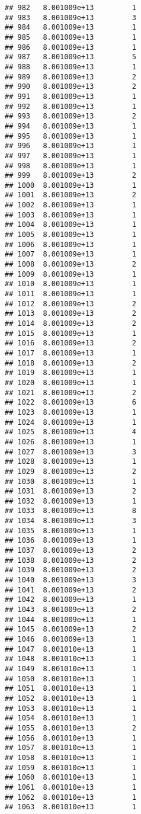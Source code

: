 \documentclass[
]{article}
\begin{document}
\begin{verbatim}
## 982   8.001009e+13         1
## 983   8.001009e+13         3
## 984   8.001009e+13         1
## 985   8.001009e+13         1
## 986   8.001009e+13         1
## 987   8.001009e+13         5
## 988   8.001009e+13         1
## 989   8.001009e+13         2
## 990   8.001009e+13         2
## 991   8.001009e+13         1
## 992   8.001009e+13         1
## 993   8.001009e+13         2
## 994   8.001009e+13         1
## 995   8.001009e+13         1
## 996   8.001009e+13         1
## 997   8.001009e+13         1
## 998   8.001009e+13         1
## 999   8.001009e+13         2
## 1000  8.001009e+13         1
## 1001  8.001009e+13         2
## 1002  8.001009e+13         1
## 1003  8.001009e+13         1
## 1004  8.001009e+13         1
## 1005  8.001009e+13         1
## 1006  8.001009e+13         1
## 1007  8.001009e+13         1
## 1008  8.001009e+13         2
## 1009  8.001009e+13         1
## 1010  8.001009e+13         1
## 1011  8.001009e+13         1
## 1012  8.001009e+13         2
## 1013  8.001009e+13         2
## 1014  8.001009e+13         2
## 1015  8.001009e+13         1
## 1016  8.001009e+13         2
## 1017  8.001009e+13         1
## 1018  8.001009e+13         2
## 1019  8.001009e+13         1
## 1020  8.001009e+13         1
## 1021  8.001009e+13         2
## 1022  8.001009e+13         6
## 1023  8.001009e+13         1
## 1024  8.001009e+13         1
## 1025  8.001009e+13         4
## 1026  8.001009e+13         1
## 1027  8.001009e+13         3
## 1028  8.001009e+13         1
## 1029  8.001009e+13         2
## 1030  8.001009e+13         1
## 1031  8.001009e+13         2
## 1032  8.001009e+13         1
## 1033  8.001009e+13         8
## 1034  8.001009e+13         3
## 1035  8.001009e+13         1
## 1036  8.001009e+13         1
## 1037  8.001009e+13         2
## 1038  8.001009e+13         2
## 1039  8.001009e+13         2
## 1040  8.001009e+13         3
## 1041  8.001009e+13         2
## 1042  8.001009e+13         1
## 1043  8.001009e+13         2
## 1044  8.001009e+13         1
## 1045  8.001009e+13         2
## 1046  8.001009e+13         1
## 1047  8.001010e+13         1
## 1048  8.001010e+13         1
## 1049  8.001010e+13         1
## 1050  8.001010e+13         1
## 1051  8.001010e+13         1
## 1052  8.001010e+13         1
## 1053  8.001010e+13         1
## 1054  8.001010e+13         1
## 1055  8.001010e+13         2
## 1056  8.001010e+13         1
## 1057  8.001010e+13         1
## 1058  8.001010e+13         1
## 1059  8.001010e+13         1
## 1060  8.001010e+13         1
## 1061  8.001010e+13         1
## 1062  8.001010e+13         1
## 1063  8.001010e+13         1

\end{verbatim}
\end{document}

